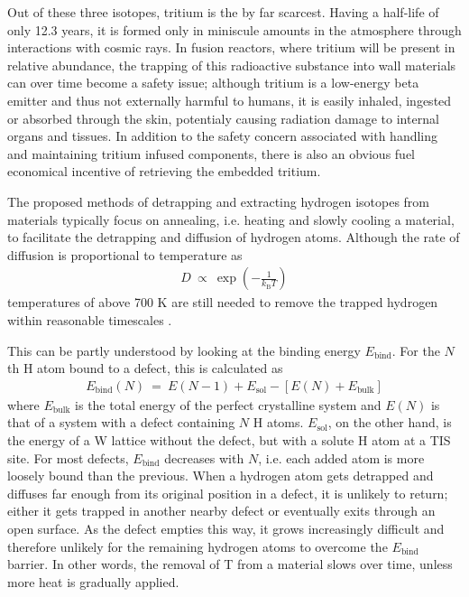Out of these three isotopes, tritium is the by far scarcest. 
Having a half-life of only 12.3 years, it is formed only in miniscule amounts in the atmosphere through interactions with cosmic rays.
In fusion reactors, where tritium will be present in relative abundance, the trapping of this radioactive substance into wall materials can over time become a safety issue; although tritium is a low-energy beta emitter and thus not externally harmful to humans, it is easily inhaled, ingested or absorbed through the skin, potentialy causing radiation damage to internal organs and tissues. \cite{tritiumHealth}
In addition to the safety concern associated with handling and maintaining tritium infused components, there is also an obvious fuel economical incentive of retrieving the embedded tritium.

The proposed methods of detrapping and extracting hydrogen isotopes from materials typically focus on annealing, i.e. heating and slowly cooling a material, to facilitate the detrapping and diffusion of hydrogen atoms. 
Although the rate of diffusion is proportional to temperature as
\begin{align}
D ~\propto~ \exp\left(-\frac{1}{k_{\text{B}}T}\right)
\end{align}
temperatures of above 700 K are still needed to remove the trapped hydrogen within reasonable timescales \cite{heinola2017long}.

This can be partly understood by looking at the binding energy $E_{\text{bind}}$. For the $N$th H atom bound to a defect, this is calculated as
\begin{align}
E_{\text{bind}}(N) ~=~ E(N-1) + E_\text{sol} - [ E(N) + E_\text{bulk} ]
\end{align}
where $E_\text{bulk}$ is the total energy of the perfect crystalline system and $E(N)$ is that of a system with a defect containing $N$ H atoms. 
$E_\text{sol}$, on the other hand, is the energy of a W lattice without the defect, but with a solute H atom at a TIS site.
For most defects, $E_{\text{bind}}$ decreases with $N$, i.e. each added atom is more loosely bound than the previous.
When a hydrogen atom gets detrapped and diffuses far enough from its original position in a defect, it is unlikely to return; either it gets trapped in another nearby defect or eventually exits through an open surface.
As the defect empties this way, it grows increasingly difficult and therefore unlikely for the remaining hydrogen atoms to overcome the $E_{\text{bind}}$ barrier.
In other words, the removal of T from a material slows over time, unless more heat is gradually applied.

